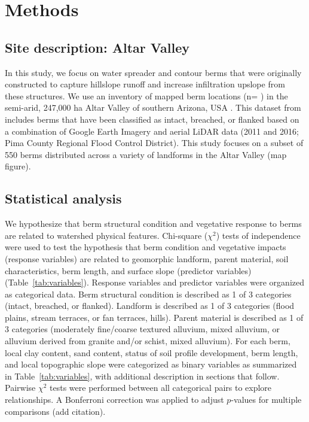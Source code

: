 \documentclass[review]{elsarticle}
\begin{document}
\section{Methods}
\subsection{Site description: Altar Valley}
\label{sec:Altar}
In this study, we focus on water spreader and contour berms that were originally constructed to capture hillslope runoff and increase infiltration upslope from these structures. We use an inventory of mapped berm locations (n= ) in the semi-arid, 247,000 ha Altar Valley of southern Arizona, USA \cite{nichols2021landscape}. This dataset from \citet{nichols2021landscape} includes berms that have been classified as intact, breached, or flanked based on a combination of Google Earth Imagery and aerial LiDAR data (2011 and 2016; Pima County Regional Flood Control District). This study focuses on a subset of 550 berms distributed across a variety of landforms in the Altar Valley (map figure).  

\subsection{Statistical analysis}
We hypothesize that berm structural condition and vegetative response to berms are related to watershed physical features. Chi-square ($\chi^2$) tests of independence were used to test the hypothesis that berm condition and vegetative impacts (response variables) are related to geomorphic landform, parent material, soil characteristics, berm length, and surface slope (predictor variables) (Table~\ref{tab:variables}). Response variables and predictor variables were organized as categorical data. Berm structural condition is described as 1 of 3 categories (intact, breached, or flanked). Landform is described as 1 of 3 categories (flood plains, stream terraces, or fan terraces, hills). Parent material is described as 1 of 3 categories (moderately fine/coarse textured alluvium, mixed alluvium, or alluvium derived from granite and/or schist, mixed alluvium).
For each berm, local clay content, sand content, status of soil profile development, berm length, and local topographic slope were categorized as binary variables as summarized in Table~\ref{tab:variables}, with additional description in sections that follow. Pairwise $\chi^2$ tests were performed between all categorical pairs to explore relationships. A Bonferroni correction was applied to adjust $p$-values for multiple comparisons (add citation).
\end{document}
